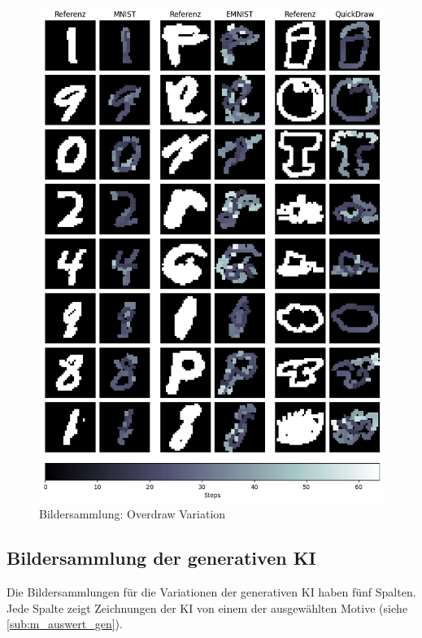 \begin{figure}[!ht]
    \centering
    \includegraphics[width=\textwidth]{images/resultate/overdraw.png}
    \caption{Bildersammlung: Overdraw Variation}\label{fig:r-overdraw}
\end{figure}

\newpage

\subsection{Bildersammlung der generativen KI}\label{sub:r_bild_gen}

Die Bildersammlungen für die Variationen der generativen KI haben fünf Spalten. Jede
Spalte zeigt Zeichnungen der KI von einem der ausgewählten Motive (siehe
\ref{sub:m_auswert_gen}).

